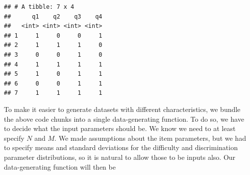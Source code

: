 \documentclass[
]{book}
\begin{document}
\begin{verbatim}
## # A tibble: 7 x 4
##      q1    q2    q3    q4
##   <int> <int> <int> <int>
## 1     1     0     0     1
## 2     1     1     1     0
## 3     0     0     1     0
## 4     1     1     1     1
## 5     1     0     1     1
## 6     0     0     1     1
## 7     1     1     1     1
\end{verbatim}

To make it easier to generate datasets with different characteristics, we bundle the above code chunks into a single data-generating function.
To do so, we have to decide what the input parameters should be.
We know we need to at least specify \(N\) and \(M\).
We made assumptions about the item parameters, but we had to specify means and standard deviations for the difficulty and discrimination parameter distributions, so it is natural to allow those to be inputs also.
Our data-generating function will then be
\end{document}
